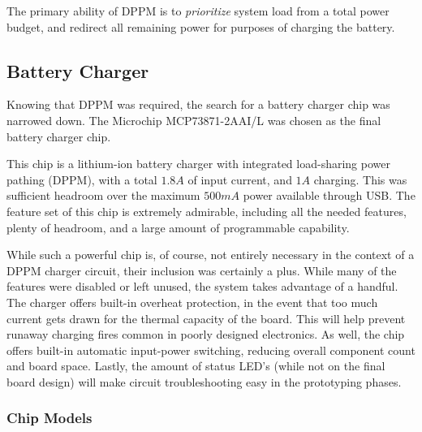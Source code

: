\documentclass[11pt]{article}
\begin{document}
The primary ability of DPPM is to \emph{prioritize} system load from a total power budget, and redirect all remaining power for purposes of charging the battery. 

\subsection{Battery Charger}

Knowing that DPPM was required, the search for a battery charger chip was narrowed down.\footnotemark {} The Microchip MCP73871-2AAI/L was chosen as the final battery charger chip. 

This chip is a lithium-ion battery charger with integrated load-sharing power pathing (DPPM), with a total \(1.8A\) of input current, and \(1A\) charging. This was sufficient headroom over the maximum \(500mA\) power available through USB.\footnotemark {} The feature set of this chip is extremely admirable, including all the needed features, plenty of headroom, and a large amount of programmable capability.

While such a powerful chip is, of course, not entirely necessary in the context of a DPPM charger circuit, their inclusion was certainly a plus. While many of the features were disabled or left unused, the system takes advantage of a handful. The charger offers built-in overheat protection, in the event that too much current gets drawn for the thermal capacity of the board. This will help prevent runaway charging fires common in poorly designed electronics. As well, the chip offers built-in automatic input-power switching, reducing overall component count and board space. Lastly, the amount of status LED's (while not on the final board design) will make circuit troubleshooting easy in the prototyping phases.

\subsubsection{Chip Models}
\end{document}
